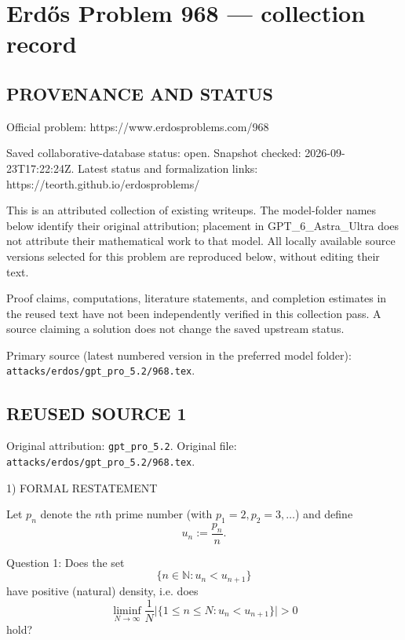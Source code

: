 \section*{Erd\H{o}s Problem 968 --- collection record}

\subsection*{PROVENANCE AND STATUS}
Official problem: https://www.erdosproblems.com/968

Saved collaborative-database status: open.
Snapshot checked: 2026-09-23T17:22:24Z.
Latest status and formalization links: https://teorth.github.io/erdosproblems/

This is an attributed collection of existing writeups. The model-folder names below identify their original attribution; placement in GPT\_6\_Astra\_Ultra does not attribute their mathematical work to that model. All locally available source versions selected for this problem are reproduced below, without editing their text.

Proof claims, computations, literature statements, and completion estimates in the reused text have not been independently verified in this collection pass. A source claiming a solution does not change the saved upstream status.

Primary source (latest numbered version in the preferred model folder): \texttt{attacks/erdos/gpt\_pro\_5.2/968.tex}.

\subsection*{REUSED SOURCE 1}
Original attribution: \texttt{gpt\_pro\_5.2}.
Original file: \texttt{attacks/erdos/gpt\_pro\_5.2/968.tex}.


1) FORMAL RESTATEMENT

Let $p_n$ denote the $n$th prime number (with $p_1=2,p_2=3,\dots$) and define
\[
 u_n := \frac{p_n}{n}.
\]

Question 1: Does the set
\[
\{n\in\mathbb N: u_n < u_{n+1}\}
\]
have positive (natural) density, i.e. does
\[
\liminf_{N\to\infty} \frac{1}{N}\bigl|\{1\le n\le N: u_n<u_{n+1}\}\bigr| >0
\]
hold?

